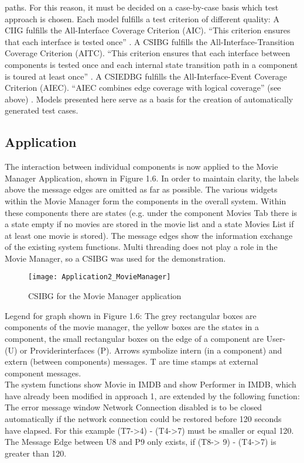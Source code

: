 paths. For this reason, it must be decided on a case-by-case basis
which test approach is chosen. Each model fulfills a test criterion
of different quality: A CIIG fulfills the All-Interface Coverage Criterion
(AIC). ``This criterion ensures that each interface is tested once''
\cite{Guan2015}. A CSIBG fulfills the All-Interface-Transition Coverage
Criterion (AITC). ``This criterion ensures that each interface between
components is tested once and each internal state transition path
in a component is toured at least once'' \cite{Guan2015}. A CSIEDBG
fulfills the All-Interface-Event Coverage Criterion (AIEC). ``AIEC
combines edge coverage with logical coverage'' (see above) \cite{Guan2015}.
Models presented here serve as a basis for the creation of automatically
generated test cases.

\subsection{Application}

The interaction between individual components is now applied to the
Movie Manager Application, shown in Figure 1.6. In order to maintain
clarity, the labels above the message edges are omitted as far as
possible. The various widgets within the Movie Manager form the components
in the overall system. Within these components there are states (e.g.
under the component \textquotedbl Movies Tab\textquotedbl{} there is
a state \textquotedbl empty\textquotedbl{} if no movies are stored
in the movie list and a state \textquotedbl Movies List\textquotedbl{}
if at least one movie is stored). The message edges show the information
exchange of the existing system functions. Multi threading does not
play a role in the Movie Manager, so a CSIBG was used for the demonstration.

\begin{figure}[H]
\centering{}\texttt{[image: Application2\_MovieManager]}\caption{CSIBG for the Movie Manager application}
\end{figure}
Legend for graph shown in Figure 1.6: The grey rectangular boxes are
components of the movie manager, the yellow boxes are the states in
a component, the small rectangular boxes on the edge of a component
are User- (U) or Providerinterfaces (P). Arrows symbolize intern (in
a component) and extern (between components) messages. \textquotedbl T\textquotedbl{}
are time stamps at external component messages. \\
The system functions \textquotedbl show Movie in IMDB\textquotedbl{}
and \textquotedbl show Performer in IMDB\textquotedbl , which have
already been modified in approach 1, are extended by the following
function: The error message window \textquotedbl Network Connection
disabled\textquotedbl{} is to be closed automatically if the network
connection could be restored before 120 seconds have elapsed. For
this example (T7-\textgreater 4) - (T4-\textgreater 7) must be smaller
or equal 120. The Message Edge between U8 and P9 only exists, if (T8-\textgreater
9) - (T4-\textgreater 7) is greater than 120.

